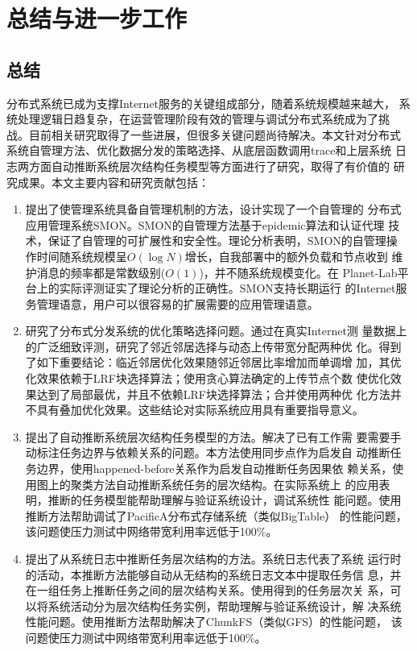 \chapter{总结与进一步工作}
\label{chap:conclusion}

\section{总结}

分布式系统已成为支撑Internet服务的关键组成部分，随着系统规模越来越大，
系统处理逻辑日趋复杂，在运营管理阶段有效的管理与调试分布式系统成为了挑
战。目前相关研究取得了一些进展，但很多关键问题尚待解决。本文针对分布式
系统自管理方法、优化数据分发的策略选择、从底层函数调用trace和上层系统
日志两方面自动推断系统层次结构任务模型等方面进行了研究，取得了有价值的
研究成果。本文主要内容和研究贡献包括：

\begin{enumerate}
  
    \item 提出了使管理系统具备自管理机制的方法，设计实现了一个自管理的
    分布式应用管理系统SMON。SMON的自管理方法基于epidemic算法和认证代理
    技术，保证了自管理的可扩展性和安全性。理论分析表明，SMON的自管理操
    作时间随系统规模呈$O(\log N)$增长，自我部署中的额外负载和节点收到
    维护消息的频率都是常数级别($O(1)$)，并不随系统规模变化。在
    Planet-Lab平台上的实际评测证实了理论分析的正确性。SMON支持长期运行
    的Internet服务管理语意，用户可以很容易的扩展需要的应用管理语意。

    \item 研究了分布式分发系统的优化策略选择问题。通过在真实Internet测
    量数据上的广泛细致评测，研究了邻近邻居选择与动态上传带宽分配两种优
    化。得到了如下重要结论：临近邻居优化效果随邻近邻居比率增加而单调增
    加，其优化效果依赖于LRF块选择算法；使用贪心算法确定的上传节点个数
    使优化效果达到了局部最优，并且不依赖LRF块选择算法；合并使用两种优
    化方法并不具有叠加优化效果。这些结论对实际系统应用具有重要指导意义。

    \item 提出了自动推断系统层次结构任务模型的方法。解决了已有工作需
    要需要手动标注任务边界与依赖关系的问题。本方法使用同步点作为启发自
    动推断任务边界，使用happened-before关系作为启发自动推断任务因果依
    赖关系，使用图上的聚类方法自动推断系统任务的层次结构。在实际系统上
    的应用表明，推断的任务模型能帮助理解与验证系统设计，调试系统性
    能问题。使用推断方法帮助调试了PacificA分布式存储系统（类似BigTable）
    的性能问题，该问题使压力测试中网络带宽利用率远低于100\%。

    \item 提出了从系统日志中推断任务层次结构的方法。系统日志代表了系统
    运行时的活动，本推断方法能够自动从无结构的系统日志文本中提取任务信
    息，并在一组任务上推断任务之间的层次结构关系。使用得到的任务层次关
    系，可以将系统活动分为层次结构任务实例，帮助理解与验证系统设计，解
    决系统性能问题。使用推断方法帮助解决了ChunkFS（类似GFS）的性能问题，
    该问题使压力测试中网络带宽利用率远低于100\%。

\end{enumerate}

